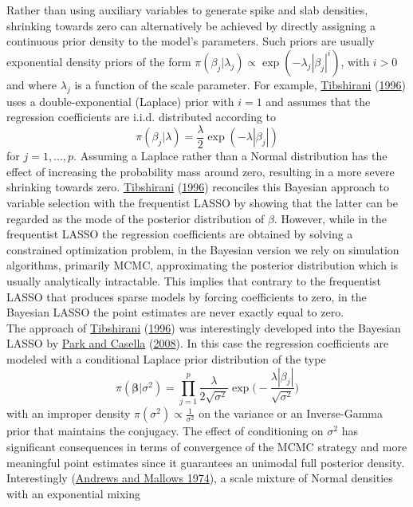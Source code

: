 \documentclass[
  12pt,
]{book}
\theoremstyle{break}
\theoremstyle{nonumberplain}
\begin{document}
Rather than using auxiliary variables to generate spike and slab
densities, shrinking towards zero can alternatively be achieved by
directly assigning a continuous prior density to the model's parameters.
Such priors are usually exponential density priors of the form
\(\pi(\beta_{j}|\lambda_{j})\propto\exp(-\lambda_{j}|\beta_{j}|^{i})\),
with \(i>0\) and where \(\lambda_{j}\) is a function of the scale
parameter. For example, \protect\hyperlink{ref-T_1996}{Tibshirani}
(\protect\hyperlink{ref-T_1996}{1996}) uses a double-exponential
(Laplace) prior with \(i=1\) and assumes that the regression
coefficients are i.i.d. distributed according to
\[\pi(\beta_{j}|\lambda)=\frac{\lambda}{2}\exp(-\lambda|\beta_{j}|)\]
for \(j=1,...,p\). Assuming a Laplace rather than a Normal distribution
has the effect of increasing the probability mass around zero, resulting
in a more severe shrinking towards zero.
\protect\hyperlink{ref-T_1996}{Tibshirani}
(\protect\hyperlink{ref-T_1996}{1996}) reconciles this Bayesian approach
to variable selection with the frequentist LASSO by showing that the
latter can be regarded as the mode of the posterior distribution of
\(\beta\). However, while in the frequentist LASSO the regression
coefficients are obtained by solving a constrained optimization problem,
in the Bayesian version we rely on simulation algorithms, primarily
MCMC, approximating the posterior distribution which is usually
analytically intractable. This implies that contrary to the frequentist
LASSO that produces sparse models by forcing coefficients to zero, in
the Bayesian LASSO the point estimates are never exactly equal to
zero.\\
The approach of \protect\hyperlink{ref-T_1996}{Tibshirani}
(\protect\hyperlink{ref-T_1996}{1996}) was interestingly developed into
the Bayesian LASSO by \protect\hyperlink{ref-PC_2008}{Park and Casella}
(\protect\hyperlink{ref-PC_2008}{2008}). In this case the regression
coefficients are modeled with a conditional Laplace prior distribution
of the type
\[\pi(\boldsymbol{\beta}|\sigma^{2})=\prod_{j=1}^{p}\frac{\lambda}{2\sqrt{\sigma^2}}\exp\bigg(-\frac{\lambda|\beta_{j}|}{\sqrt{\sigma^2}}\bigg)\]
with an improper density \(\pi(\sigma^{2})\propto \frac{1}{\sigma^{2}}\)
on the variance or an Inverse-Gamma prior that maintains the conjugacy.
The effect of conditioning on \(\sigma^2\) has significant consequences
in terms of convergence of the MCMC strategy and more meaningful point
estimates since it guarantees an unimodal full posterior density.
Interestingly (\protect\hyperlink{ref-AM_1974}{Andrews and Mallows
1974}), a scale mixture of Normal densities with an exponential mixing
\end{document}
